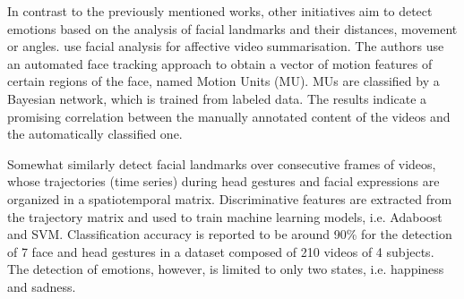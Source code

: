 
In contrast to the previously mentioned works, other initiatives aim to detect emotions based on the analysis of facial landmarks and their distances, movement or angles. \textcite{joho2009exploiting} use facial analysis for affective video summarisation. The authors use an automated face tracking approach to obtain a vector of motion features of certain regions of the face, named Motion Units (MU). MUs are classified by a Bayesian network, which is trained from labeled data. The results indicate a promising correlation between the manually annotated content of the videos and the automatically classified one.

Somewhat similarly \textcite{akakin2010spatiotemporal} detect facial landmarks over consecutive frames of videos, whose trajectories (time series) during head gestures and facial expressions are organized in a spatiotemporal matrix. Discriminative features are extracted from the trajectory matrix and used to train machine learning models, i.e. Adaboost and SVM. Classification accuracy is reported to be around 90\% for the detection of 7 face and head gestures in a dataset composed of 210 videos of 4 subjects. The detection of emotions, however, is limited to only two states, i.e. happiness and sadness.

